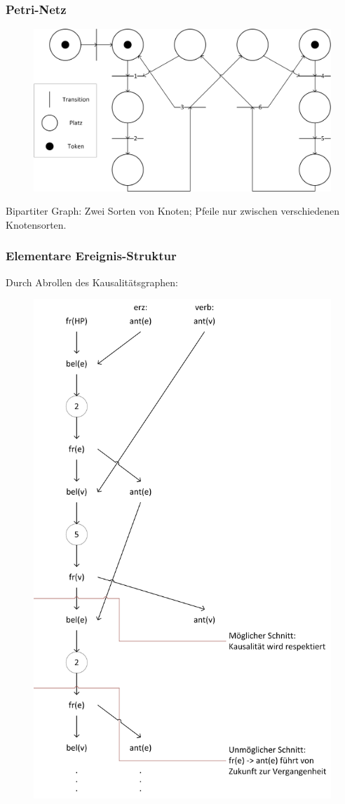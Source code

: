 \subsubsection*{Petri-Netz}
\begin{figure}[H]
	\begin{center}
		\includegraphics[width=\textwidth]{res/PetriNetz}
		\label{pic:synpetri}
	\end{center}
\end{figure} 
Bipartiter Graph: Zwei Sorten von Knoten; Pfeile nur zwischen verschiedenen Knotensorten.

\subsubsection*{Elementare Ereignis-Struktur}
Durch Abrollen des Kausalitätsgraphen:
\begin{figure}[H]
	\begin{center}
		\includegraphics[width=.7\textwidth]{res/ElementareEreignisstruktur}
		\label{pic:synelem}
	\end{center}
\end{figure} 

